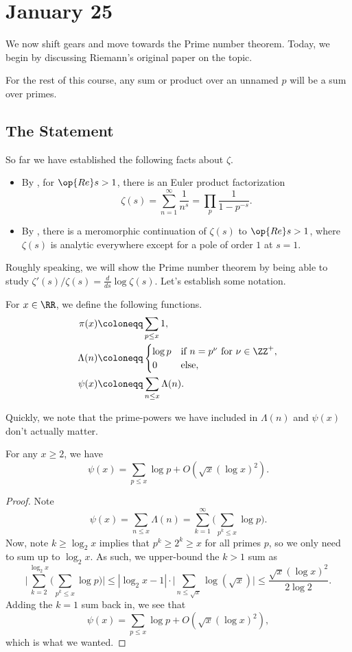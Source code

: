 \documentclass[../notes.tex]{subfiles}
\begin{document}
\section{January 25}

We now shift gears and move towards the Prime number theorem. Today, we begin by discussing Riemann's original paper on the topic.
\begin{remark}
	For the rest of this course, any sum or product over an unnamed $p$ will be a sum over primes.
\end{remark}

\subsection{The Statement}
So far we have established the following facts about $\zeta$.
\begin{itemize}
	\item By , for $\op{Re}s>1$, there is an Euler product factorization
	\[\zeta(s)=\sum_{n=1}^\infty\frac1{n^s}=\prod_p\frac1{1-p^{-s}}.\]
	\item By , there is a meromorphic continuation of $\zeta(s)$ to $\op{Re}s>1$, where $\zeta(s)$ is analytic everywhere except for a pole of order $1$ at $s=1$.
\end{itemize}
Roughly speaking, we will show the Prime number theorem by being able to study $\zeta'(s)/\zeta(s)=\frac d{ds}\log\zeta(s)$. Let's establish some notation.
\begin{definition}
	For $x\in\RR$, we define the following functions.
	\begin{align*}
		\pi(x) &\coloneqq \sum_{p\le x}1, \\
		\Lambda(n) &\coloneqq\begin{cases}
			\log p & \text{if }n=p^\nu\text{ for }\nu\in\ZZ^+, \\
			0 & \text{else},
		\end{cases} \\
		\psi(x) &\coloneqq \sum_{n\le x}\Lambda(n).
	\end{align*}
\end{definition}
Quickly, we note that the prime-powers we have included in $\Lambda(n)$ and $\psi(x)$ don't actually matter.
\begin{lemma} \label{lem:no-prime-powers}
	For any $x\ge2$, we have
	\[\psi(x)=\sum_{p\le x}\log p+O\left(\sqrt x(\log x)^2\right).\]
\end{lemma}
\begin{proof}
	Note
	\[\psi(x)=\sum_{n\le x}\Lambda(n)=\sum_{k=1}^\infty\Bigg(\sum_{p^k\le x}\log p\Bigg).\]
	Now, note $k\ge\log_2x$ implies that $p^k\ge2^k\ge x$ for all primes $p$, so we only need to sum up to $\log_2x$. As such, we upper-bound the $k>1$ sum as
	\[\Bigg|\sum_{k=2}^{\log_2x}\Bigg(\sum_{p^k\le x}\log p\Bigg)\Bigg|\le|\log_2x-1|\cdot\Bigg|\sum_{n\le\sqrt x}\log(\sqrt x)\Bigg|\le\frac{\sqrt x(\log x)^2}{2\log2}.\]
	Adding the $k=1$ sum back in, we see that
	\[\psi(x)=\sum_{p\le x}\log p+O\left(\sqrt x(\log x)^2\right),\]
	which is what we wanted.
\end{proof}
\end{document}
